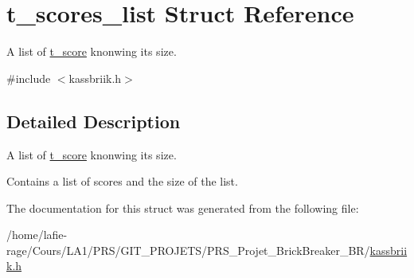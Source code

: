 \hypertarget{structt__scores__list}{}\section{t\+\_\+scores\+\_\+list Struct Reference}
\label{structt__scores__list}


A list of \hyperlink{structt__score}{t\+\_\+score} knonwing its size.  




{\ttfamily \#include $<$kassbriik.\+h$>$}



\subsection{Detailed Description}
A list of \hyperlink{structt__score}{t\+\_\+score} knonwing its size. 

Contains a list of scores and the size of the list. 

The documentation for this struct was generated from the following file\+:\begin{DoxyCompactItemize}
\item 
/home/lafie-\/rage/\+Cours/\+L\+A1/\+P\+R\+S/\+G\+I\+T\+\_\+\+P\+R\+O\+J\+E\+T\+S/\+P\+R\+S\+\_\+\+Projet\+\_\+\+Brick\+Breaker\+\_\+\+B\+R/\hyperlink{kassbriik_8h}{kassbriik.\+h}\end{DoxyCompactItemize}
